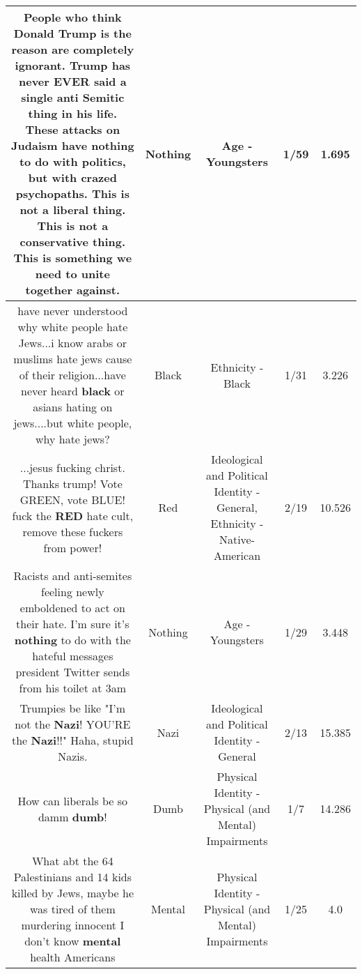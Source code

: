 \documentclass[11pt]{article}
\newlength\mylength
\begin{document}
\begin{center}
\begin{longtable}{|C{.65\mylength}|C{.30\mylength}|C{.12\mylength}|C{.12\mylength}|C{.12\mylength}|}
  \small People who think Donald Trump is the reason are completely ignorant. Trump has never EVER said a single anti Semitic thing in his life. These attacks on Judaism have \textbf{nothing} to do with politics, but with crazed psychopaths. This is not a liberal thing. This is not a conservative thing. This is something we need to unite together against.\normalsize   & Nothing & Age - Youngsters & 1/59 & 1.695 \\  \hline
  \small have never understood why white people hate Jews...i know arabs or muslims hate jews cause of their religion...have never heard \textbf{black} or asians hating on jews....but white people, why hate jews?\normalsize   & Black & Ethnicity - Black & 1/31 & 3.226 \\  \hline
  \small ...jesus fucking christ. Thanks trump! Vote GREEN, vote BLUE! fuck the \textbf{R\textbf{ED}} hate cult, remove these fuckers from power!\normalsize   & Red &  Ideological and Political Identity - General, Ethnicity - Native-American & 2/19 & 10.526 \\  \hline
  \small Racists and anti-semites feeling newly emboldened to act on their hate. I'm sure it's \textbf{nothing} to do with the hateful messages president Twitter sends from his toilet at 3am\normalsize   & Nothing & Age - Youngsters & 1/29 & 3.448 \\  \hline
  \small Trumpies be like "I'm not the \textbf{Nazi}! YOU'RE the \textbf{Nazi}!!" Haha, stupid Nazis.\normalsize   & Nazi &  Ideological and Political Identity - General & 2/13 & 15.385 \\  \hline
  \small How can liberals be so damm \textbf{dumb}!\normalsize   & Dumb & Physical Identity - Physical (and Mental) Impairments & 1/7 & 14.286 \\  \hline
  \small What abt the 64 Palestinians and 14 kids killed by Jews, maybe he was tired of them murdering innocent I don't know \textbf{mental} health Americans\normalsize   & Mental & Physical Identity - Physical (and Mental) Impairments & 1/25 & 4.0 \\  \hline

\end{longtable}
\end{center}
\end{document}
